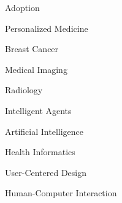 
\Large
Adoption

\vspace{10.00mm}

\Large
Personalized Medicine

\vspace{10.00mm}

\Large
Breast Cancer

\vspace{10.00mm}

\Large
Medical Imaging

\vspace{10.00mm}

\Large
Radiology

\vspace{10.00mm}

\Large
Intelligent Agents

\vspace{10.00mm}

\Large
Artificial Intelligence

\vspace{10.00mm}

\Large
Health Informatics

\vspace{10.00mm}

\Large
User-Centered Design

\vspace{10.00mm}

\Large
Human-Computer Interaction
